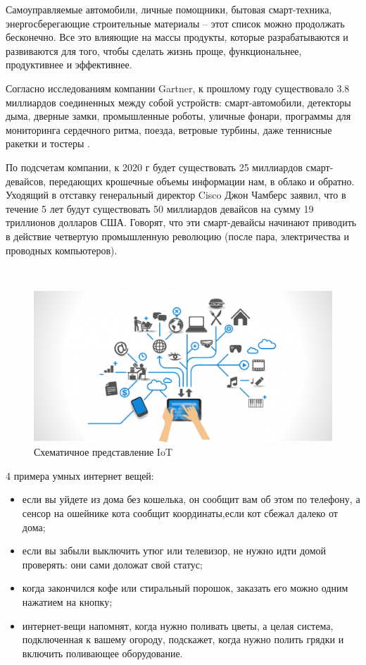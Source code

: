 Самоуправляемые автомобили, личные помощники, бытовая смарт-техника, энергосберегающие строительные материалы – этот список можно продолжать бесконечно. Все это влияющие на массы продукты, которые разрабатываются и развиваются для того, чтобы сделать жизнь проще, функциональнее, продуктивнее и эффективнее.

Согласно исследованиям компании Gartner, к прошлому году существовало 3.8 миллиардов соединенных между собой устройств: смарт-автомобили, детекторы дыма, дверные замки, промышленные роботы, уличные фонари, программы для мониторинга сердечного ритма, поезда, ветровые турбины, даже теннисные ракетки и тостеры .

По подсчетам компании, к 2020 г будет существовать 25 миллиардов смарт-девайсов, передающих крошечные объемы информации нам, в облако и обратно. Уходящий в отставку генеральный директор Cisco Джон Чамберс заявил, что в течение 5 лет будут существовать 50 миллиардов девайсов на сумму 19 триллионов долларов США. Говорят, что эти смарт-девайсы начинают приводить в действие четвертую промышленную революцию (после пара, электричества и проводных компьютеров).

~
\begin{figure}[H]
\centering
	\includegraphics[scale=0.4]{figures/iot_scheme.png}
	\caption{Схематичное представление IoT}
	\label{fig:subject:iot:scheme}
\end{figure}

4 примера умных интернет вещей:
\begin{itemize}
	\item если вы уйдете из дома без кошелька, он сообщит вам об этом по телефону, а сенсор на ошейнике кота сообщит координаты,если кот сбежал далеко от дома;
	\item если вы забыли выключить утюг или телевизор, не нужно идти домой проверять: они сами доложат свой статус;
	\item когда закончился кофе или стиральный порошок, заказать его можно одним нажатием на кнопку;
	\item интернет-вещи напомнят, когда нужно поливать цветы, а целая система, подключенная к вашему огороду, подскажет, когда нужно полить грядки и включить поливающее оборудование.
\end{itemize}

